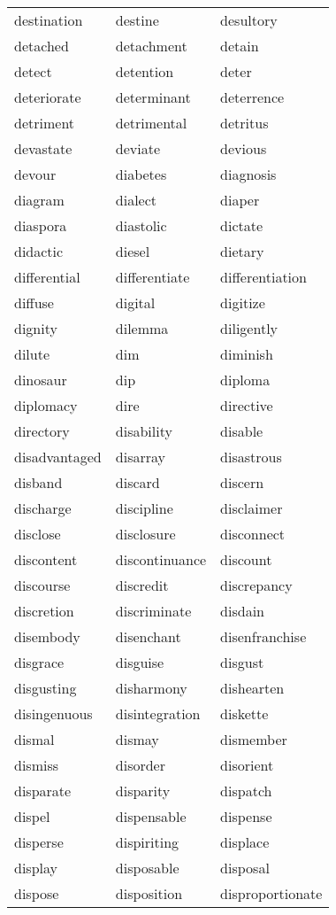 \documentclass{minimal}
\begin{document}
\begin{longtable}{p{2.7cm}@{\hskip 0.2cm}p{2.7cm}@{\hskip 0.2cm}p{2.7cm}}
destination & destine & desultory \\
detached & detachment & detain \\
detect & detention & deter \\
deteriorate & determinant & deterrence \\
detriment & detrimental & detritus \\
devastate & deviate & devious \\
devour & diabetes & diagnosis \\
diagram & dialect & diaper \\
diaspora & diastolic & dictate \\
didactic & diesel & dietary \\
differential & differentiate & differentiation \\
diffuse & digital & digitize \\
dignity & dilemma & diligently \\
dilute & dim & diminish \\
dinosaur & dip & diploma \\
diplomacy & dire & directive \\
directory & disability & disable \\
disadvantaged & disarray & disastrous \\
disband & discard & discern \\
discharge & discipline & disclaimer \\
disclose & disclosure & disconnect \\
discontent & discontinuance & discount \\
discourse & discredit & discrepancy \\
discretion & discriminate & disdain \\
disembody & disenchant & disenfranchise \\
disgrace & disguise & disgust \\
disgusting & disharmony & dishearten \\
disingenuous & disintegration & diskette \\
dismal & dismay & dismember \\
dismiss & disorder & disorient \\
disparate & disparity & dispatch \\
dispel & dispensable & dispense \\
disperse & dispiriting & displace \\
display & disposable & disposal \\
dispose & disposition & disproportionate \\

\end{longtable}
\end{document}
